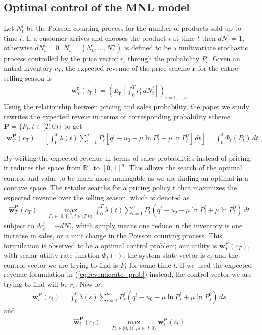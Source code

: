 \subsection{Optimal control of the MNL model}
Let $N_t^i$ be the Poisson counting process for the number of products sold up to time $t$. If a customer arrives and chooses the product $i$ at time $t$ then $dN_t^i = 1$, otherwise $dN_t^i=0$. $N_t = (N_t^1, \ldots, N_t^n)$ is defined to be a multivariate stochastic process controlled by the price vector $r_t$ through the probability $P_t$. Given an initial inventory $c_T$, the expected revenue of the price scheme $\mathbf{r}$ 	for the entire selling season is 
\begin{align}
\mathbf{w}_T^{\mathbf{r}}(c_T) = \left(E_{\mathbf{r}}\left[\int_0^Tr^i_t\,dN^i_t\right]\right)_{i=1,\ldots,n}
\end{align}
Using the relationship between pricing and sales probability, the paper we study rewrites the expected reveue in terms of corresponding probability scheme $\mathbf{P}=\{P_t, t \in [T,0)\}$ to get
\begin{align}
\mathbf{w}^{\mathbf{P}}_T(c_T) = \left[\int_{0}^{T}\lambda(t) \sum_{i=1}^{n}P_t^i[q^i-u_0-\mu \ln P_t^i + \mu \ln P_t^0]\,dt\right] = \int_{0}^{T}\Phi_t(P_t)\,dt
\end{align}

By writing the expected revenue in terms of sales probabilities instead of pricing, it reduces the space from $\mathbb{R}^n_+$ to $[0,1]^n$. This allows the search of the optimal control and value to be much more managable as we are finding an optimal in a concave space. The retailer searchs for a pricing policy $\hat{\mathbf{r}}$ that maximizes the expected revenue over the selling season, which is denoted as
\begin{align}
\hat{\mathbf{w}}_T^{\mathbf{P}}(c_T) = \max_{P_t \in [0,1)^n, t \in [T,0)}\int_{0}^{T}\lambda(t)\sum_{i=1}^{n}P_t^i\left(q^i-u_0-\mu \ln P_t^i+\mu \ln P_t^0\right)\, dt
\end{align}
subject to $dc_t^i = -dN_t^i$, which simply means one reduce in the inventory is one increase in sales, or a unit change in the Poisson counting process. This formulation is observed to be a optimal control problem; our utility is $\mathbf{w}_T^{\mathbf{P}}(c_T)$, with scalar utility rate function $\Phi_t(\cdot)$, the system state vector is $c_t$ and the control vector we are trying to find is $P_t$ for some time $t$. If we used the expected revenue formulation in (\ref{eq:revenuerate_prob}) instead, the control vector we are trying to find will be $r_t$. Now let
\begin{align}
\mathbf{w}_t^{\mathbf{P}}(c_t) = \int_{0}^{t}\lambda(s)\sum_{i=1}^{n}P_s^i\left(q^i-u_0-\mu \ln P_s^i+\mu \ln P_s^0\right)\, ds
\end{align}
and 
\begin{align}
\hat{\mathbf{w}}_t^{\mathbf{P}}(c_t) = \max_{P_s \in [0,1)^n, s \in [t,0)} \mathbf{w}_t^{\mathbf{P}}(c_t)
\end{align}

